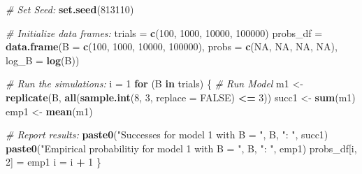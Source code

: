 \documentclass[
]{article}
\newenvironment{Shaded}{\begin{snugshade}}{\end{snugshade}}
\newcommand{\AttributeTok}[1]{\textcolor[rgb]{0.13,0.29,0.53}{#1}}
\newcommand{\CommentTok}[1]{\textcolor[rgb]{0.56,0.35,0.01}{\textit{#1}}}
\newcommand{\ConstantTok}[1]{\textcolor[rgb]{0.56,0.35,0.01}{#1}}
\newcommand{\ControlFlowTok}[1]{\textcolor[rgb]{0.13,0.29,0.53}{\textbf{#1}}}
\newcommand{\DecValTok}[1]{\textcolor[rgb]{0.00,0.00,0.81}{#1}}
\newcommand{\FunctionTok}[1]{\textcolor[rgb]{0.13,0.29,0.53}{\textbf{#1}}}
\newcommand{\NormalTok}[1]{#1}
\newcommand{\OtherTok}[1]{\textcolor[rgb]{0.56,0.35,0.01}{#1}}
\newcommand{\SpecialCharTok}[1]{\textcolor[rgb]{0.81,0.36,0.00}{\textbf{#1}}}
\newcommand{\StringTok}[1]{\textcolor[rgb]{0.31,0.60,0.02}{#1}}
\begin{document}
\begin{Shaded}
\begin{Highlighting}[]
\CommentTok{\# Set Seed:}
\FunctionTok{set.seed}\NormalTok{(}\DecValTok{813110}\NormalTok{)}

\CommentTok{\# Initialize data frames:}
\NormalTok{trials }\OtherTok{=} \FunctionTok{c}\NormalTok{(}\DecValTok{100}\NormalTok{, }\DecValTok{1000}\NormalTok{, }\DecValTok{10000}\NormalTok{, }\DecValTok{100000}\NormalTok{)}
\NormalTok{probs\_df }\OtherTok{=} \FunctionTok{data.frame}\NormalTok{(}\AttributeTok{B =} \FunctionTok{c}\NormalTok{(}\DecValTok{100}\NormalTok{, }\DecValTok{1000}\NormalTok{, }\DecValTok{10000}\NormalTok{, }\DecValTok{100000}\NormalTok{), }
                   \AttributeTok{probs =} \FunctionTok{c}\NormalTok{(}\ConstantTok{NA}\NormalTok{, }\ConstantTok{NA}\NormalTok{, }\ConstantTok{NA}\NormalTok{, }\ConstantTok{NA}\NormalTok{),}
                   \AttributeTok{log\_B =} \FunctionTok{log}\NormalTok{(B))}

\CommentTok{\# Run the simulations:}
\NormalTok{i }\OtherTok{=} \DecValTok{1}
\ControlFlowTok{for}\NormalTok{ (B }\ControlFlowTok{in}\NormalTok{ trials) \{}
    \CommentTok{\# Run Model}
\NormalTok{    m1 }\OtherTok{\textless{}{-}} \FunctionTok{replicate}\NormalTok{(B, }\FunctionTok{all}\NormalTok{(}\FunctionTok{sample.int}\NormalTok{(}\DecValTok{8}\NormalTok{, }\DecValTok{3}\NormalTok{, }\AttributeTok{replace =} \ConstantTok{FALSE}\NormalTok{) }\SpecialCharTok{\textless{}=} \DecValTok{3}\NormalTok{))}
\NormalTok{    succ1 }\OtherTok{\textless{}{-}} \FunctionTok{sum}\NormalTok{(m1)}
\NormalTok{    emp1  }\OtherTok{\textless{}{-}} \FunctionTok{mean}\NormalTok{(m1)}
    
    \CommentTok{\# Report results:}
    \FunctionTok{paste0}\NormalTok{(}\StringTok{"Successes for model 1 with B = "}\NormalTok{, B, }\StringTok{": "}\NormalTok{, succ1)}
    \FunctionTok{paste0}\NormalTok{(}\StringTok{"Empirical probabilitiy for model 1 with B = "}\NormalTok{, B, }\StringTok{": "}\NormalTok{, emp1)}
\NormalTok{    probs\_df[i, }\DecValTok{2}\NormalTok{] }\OtherTok{=}\NormalTok{ emp1}
\NormalTok{    i }\OtherTok{=}\NormalTok{ i }\SpecialCharTok{+} \DecValTok{1}
\NormalTok{\}}


\end{Highlighting}
\end{Shaded}
\end{document}
